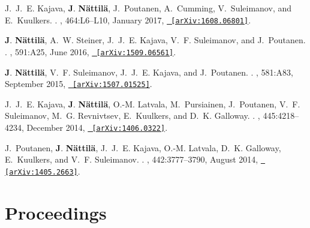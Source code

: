 \documentclass[letterpaper, onecolumn, 11pt]{article}
\begin{document}
\begin{thebibliography}{10}
J.~J.~E. {Kajava}, \textbf{J}. \textbf{N{\"a}ttil{\"a}}, J.~{Poutanen},
  A.~{Cumming}, V.~{Suleimanov}, and E.~{Kuulkers}.
.
\newblock {\em \mnras}, 464:L6--L10, January 2017,
  \href{http://arxiv.org/abs/1608.06801}{\nolinkurl{ [arXiv:1608.06801]}}.

\textbf{J}. \textbf{N{\"a}ttil{\"a}}, A.~W. {Steiner}, J.~J.~E. {Kajava}, V.~F.
  {Suleimanov}, and J.~{Poutanen}.
.
\newblock {\em \aap}, 591:A25, June 2016,
  \href{http://arxiv.org/abs/1509.06561}{\nolinkurl{ [arXiv:1509.06561]}}.

\textbf{J}. \textbf{N{\"a}ttil{\"a}}, V.~F. {Suleimanov}, J.~J.~E. {Kajava},
  and J.~{Poutanen}.
.
\newblock {\em \aap}, 581:A83, September 2015,
  \href{http://arxiv.org/abs/1507.01525}{\nolinkurl{ [arXiv:1507.01525]}}.

J.~J.~E. {Kajava}, \textbf{J}. \textbf{N{\"a}ttil{\"a}}, O.-M. {Latvala},
  M.~{Pursiainen}, J.~{Poutanen}, V.~F. {Suleimanov}, M.~G. {Revnivtsev},
  E.~{Kuulkers}, and D.~K. {Galloway}.
.
\newblock {\em \mnras}, 445:4218--4234, December 2014,
  \href{http://arxiv.org/abs/1406.0322}{\nolinkurl{ [arXiv:1406.0322]}}.

J.~{Poutanen}, \textbf{J}. \textbf{N{\"a}ttil{\"a}}, J.~J.~E. {Kajava}, O.-M.
  {Latvala}, D.~K. {Galloway}, E.~{Kuulkers}, and V.~F. {Suleimanov}.
.
\newblock {\em \mnras}, 442:3777--3790, August 2014,
  \href{http://arxiv.org/abs/1405.2663}{\nolinkurl{ [arXiv:1405.2663]}}.

\end{thebibliography}





\vspace{1cm}
\section*{Proceedings}
\end{document}
